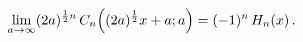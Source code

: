 \[\lim_{a\to\infty}(2a)^{\frac{1}{2}n}\mathop{C_{n}\/}\nolimits\!\left((2a)^{%
\frac{1}{2}}x+a;a\right)=(-1)^{n}\mathop{H_{n}\/}\nolimits\!\left(x\right).\]